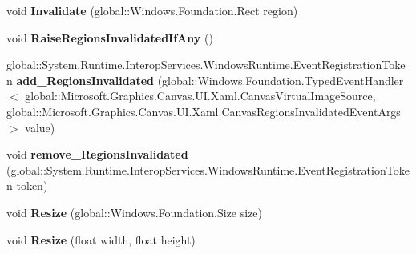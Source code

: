 \begin{DoxyCompactItemize}
void {\bfseries Invalidate} (global\+::\+Windows.\+Foundation.\+Rect region)
\item 
\mbox{\label{class_microsoft_1_1_graphics_1_1_canvas_1_1_u_i_1_1_xaml_1_1_canvas_virtual_image_source_acd73537ab914ef14e5e244675ca193a1}} 
void {\bfseries Raise\+Regions\+Invalidated\+If\+Any} ()
\item 
\mbox{\label{class_microsoft_1_1_graphics_1_1_canvas_1_1_u_i_1_1_xaml_1_1_canvas_virtual_image_source_a46f564da4b1f510265fd609033699076}} 
global\+::\+System.\+Runtime.\+Interop\+Services.\+Windows\+Runtime.\+Event\+Registration\+Token {\bfseries add\+\_\+\+Regions\+Invalidated} (global\+::\+Windows.\+Foundation.\+Typed\+Event\+Handler$<$ global\+::\+Microsoft.\+Graphics.\+Canvas.\+U\+I.\+Xaml.\+Canvas\+Virtual\+Image\+Source, global\+::\+Microsoft.\+Graphics.\+Canvas.\+U\+I.\+Xaml.\+Canvas\+Regions\+Invalidated\+Event\+Args $>$ value)
\item 
\mbox{\label{class_microsoft_1_1_graphics_1_1_canvas_1_1_u_i_1_1_xaml_1_1_canvas_virtual_image_source_a137832e2a437516e4b042f34a8da2bde}} 
void {\bfseries remove\+\_\+\+Regions\+Invalidated} (global\+::\+System.\+Runtime.\+Interop\+Services.\+Windows\+Runtime.\+Event\+Registration\+Token token)
\item 
\mbox{\label{class_microsoft_1_1_graphics_1_1_canvas_1_1_u_i_1_1_xaml_1_1_canvas_virtual_image_source_ac6286392a14c2a5995e9eb313e6d1b10}} 
void {\bfseries Resize} (global\+::\+Windows.\+Foundation.\+Size size)
\item 
\mbox{\label{class_microsoft_1_1_graphics_1_1_canvas_1_1_u_i_1_1_xaml_1_1_canvas_virtual_image_source_adc3ef1fa23c6bfa405a644561183b88f}} 
void {\bfseries Resize} (float width, float height)
\item 
\mbox{\label{class_microsoft_1_1_graphics_1_1_canvas_1_1_u_i_1_1_xaml_1_1_canvas_virtual_image_source_aab3cb8ea864e0d0639ab6ad043256e06}} 

\end{DoxyCompactItemize}
